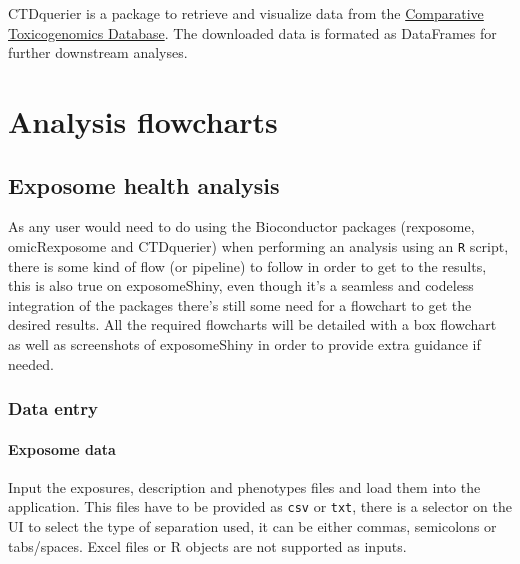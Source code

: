 \documentclass[
]{book}
\begin{document}
CTDquerier is a package to retrieve and visualize data from the \href{http://ctdbase.org/}{Comparative Toxicogenomics Database}. The downloaded data is formated as DataFrames for further downstream analyses.

\hypertarget{analysis-flowcharts}{%
\chapter{Analysis flowcharts}\label{analysis-flowcharts}}

\hypertarget{exposome-health-analysis}{%
\section{Exposome health analysis}\label{exposome-health-analysis}}

As any user would need to do using the Bioconductor packages (rexposome, omicRexposome and CTDquerier) when performing an analysis using an \texttt{R} script, there is some kind of flow (or pipeline) to follow in order to get to the results, this is also true on exposomeShiny, even though it's a seamless and codeless integration of the packages there's still some need for a flowchart to get the desired results. All the required flowcharts will be detailed with a box flowchart as well as screenshots of exposomeShiny in order to provide extra guidance if needed.

\hypertarget{data-entry}{%
\subsection{Data entry}\label{data-entry}}

\hypertarget{exposome-data}{%
\subsubsection{Exposome data}\label{exposome-data}}

Input the exposures, description and phenotypes files and load them into the application. This files have to be provided as \texttt{csv} or \texttt{txt}, there is a selector on the UI to select the type of separation used, it can be either commas, semicolons or tabs/spaces. Excel files or R objects are not supported as inputs.
\end{document}
